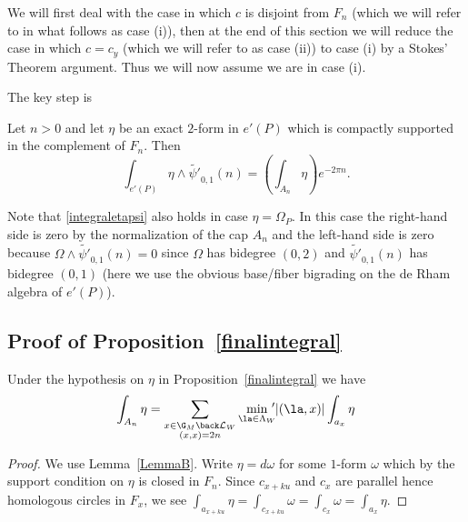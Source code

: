 We will first deal with the case in which $c$ is disjoint from $F_n$ (which we will refer to in what follows as case (i)), then at the end of this section we will reduce the case in which $c=c_y$ (which we will refer to as case (ii)) to case (i) by a Stokes' Theorem argument.
Thus we will now assume we are in case (i).


The key step is 

\begin{proposition}\label{finalintegral}
Let $n>0$ and let $\eta$ be an exact $2$-form in $e'(P)$ which is compactly supported in the complement of $F_n$. Then 
\begin{equation}\label{integraletapsi}
 \int_{e'(P)} \eta \wedge \tilde{\psi'}_{0,1}(n) = \left(\int_{A_n} \eta\right) e^{ - 2 \pi n}. 
\end{equation}
\end{proposition}
\begin{remark}\label{youwillneedthis}
Note that \eqref{integraletapsi} also holds in case $\eta =\Omega_P$. In this case the right-hand side is zero by the normalization of the cap $A_n$ and the left-hand side is zero because $\Omega \wedge \tilde{\psi'}_{0,1}(n) =0$ since $\Omega$ has bidegree $(0,2)$
and $\tilde{\psi'}_{0,1}(n)$ has bidegree $(0,1)$ (here we use the obvious base/fiber bigrading on the de Rham algebra of $e'(P)$). 
\end{remark} 

\subsection{Proof of Proposition~\ref{finalintegral}}\label{8.2}


\begin{lemma}\label{LemmaA}
Under the hypothesis on $\eta$ in Proposition~\ref{finalintegral} we have
\begin{equation*}
 \int_{A_n} \eta = \sum_{ \substack{x\in \G_M \back \mathcal{L}_W \\ (x,x)=2n}} \min_{\la \in \Lambda_W} {\hspace{-5pt}'} |(\la,x)| \int_{a_x} \eta
\end{equation*}
\end{lemma}

\begin{proof}
We use Lemma~\ref{LemmaB}. Write $\eta = d \omega$ for some $1$-form $\omega$ which by the support condition on $\eta$ is closed in $F_n$. Since $c_{x+ku}$ and $c_x$ are parallel hence homologous circles in $F_x$, we see $\int_{a_{x+ku}} \eta = \int_{c_{x+ku}} \omega = \int_{c_x} \omega = \int_{a_x} \eta$. 
\end{proof}



